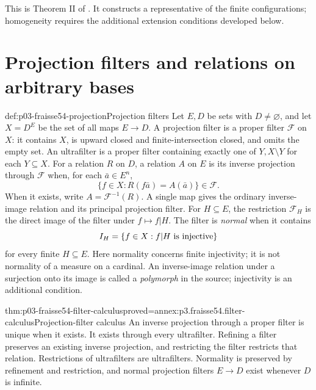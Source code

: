 This is Theorem II of \cite[\S\S2.3--2.7]{Fraisse1954}. It constructs a
representative of the finite configurations; homogeneity requires the
additional extension conditions developed below.

\section{Projection filters and relations on arbitrary bases}
\label{sec:p03-fraisse54-projection-filters}

\begin{hbdefinition}{def:p03-fraisse54-projection}{Projection filters}
Let \(E,D\) be sets with \(D\ne\varnothing\), and let
\(X=D^E\) be the set of all maps \(E\to D\). A projection filter is a
proper filter \(\mathcal F\) on \(X\): it contains \(X\), is upward
closed and finite-intersection closed, and omits the empty set.
An ultrafilter is a proper filter containing exactly one of
\(Y,X\setminus Y\) for each \(Y\subseteq X\).
For a relation \(R\) on \(D\), a relation \(A\) on \(E\) is its inverse
projection through \(\mathcal F\) when, for each \(\bar a\in E^n\),
\[
 \{f\in X:R(f\bar a)=A(\bar a)\}\in\mathcal F.
\]
When it exists, write \(A=\mathcal F^{-1}(R)\). A single map gives the
ordinary inverse-image relation and its principal projection filter.
For \(H\subseteq E\), the restriction \(\mathcal F_H\) is the direct
image of the filter under \(f\mapsto f|H\).
The filter is \emph{normal} when it contains
\[
 I_H=\{f\in X:f|H\hbox{ is injective}\}
\]
for every finite \(H\subseteq E\). Here normality concerns finite
injectivity; it is not normality of a measure on a cardinal.
An inverse-image relation under a surjection onto its image is called a
\emph{polymorph} in the source; injectivity is an additional condition.
\end{hbdefinition}

\begin{hblemma}{thm:p03-fraisse54-filter-calculus}{proved=annex:p3.fraisse54.filter-calculus}{Projection-filter calculus}
An inverse projection through a proper filter is unique when it exists.
It exists through every ultrafilter. Refining a filter preserves an existing
inverse projection, and restricting the filter restricts that relation.
Restrictions of ultrafilters are ultrafilters. Normality is preserved by
refinement and restriction, and normal projection filters \(E\to D\)
exist whenever \(D\) is infinite.
\end{hblemma}

